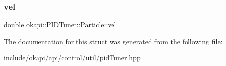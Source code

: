 \mbox{\label{structokapi_1_1PIDTuner_1_1Particle_a16dc34bf86fd5c57182d513a597249c8}} 
\subsubsection{\texorpdfstring{vel}{vel}}
{\footnotesize\ttfamily double okapi\+::\+P\+I\+D\+Tuner\+::\+Particle\+::vel}



The documentation for this struct was generated from the following file\+:\begin{DoxyCompactItemize}
\item 
include/okapi/api/control/util/\mbox{\hyperlink{pidTuner_8hpp}{pid\+Tuner.\+hpp}}\end{DoxyCompactItemize}

